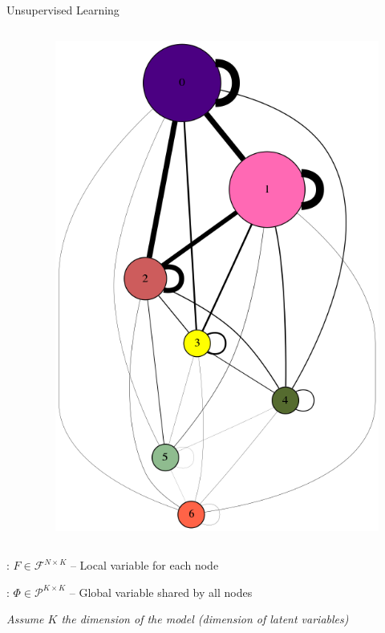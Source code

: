 \begin{frame}[t]{Unsupervised Learning}
    \begin{columns}
        \begin{column}{0.5\textwidth}
            
        \end{column}
        \begin{column}{0.5\textwidth}
        \begin{figure}[h]
        \includegraphics[scale=0.15]{img/gdot.png}
        \end{figure}
        \end{column}
    \end{columns}

    

    \begin{description}[align]
        \item[A latent feature matrix]: $F \in \mathcal{F}^{N\times K}$ -- Local variable for each node
        \item[A latent weights matrix]:  $\Phi \in \mathcal{P}^{K\times K}$ -- Global variable shared by all nodes
    \end{description}
    \emph{Assume $K$ the dimension of the model (dimension of latent variables)}


\end{frame}
